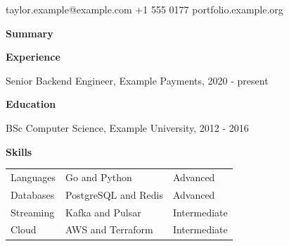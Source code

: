 \documentclass[10pt]{article}
\begin{document}
{\LARGE \Person}\par taylor.example@example.com \quad +1 555 0177 \quad portfolio.example.org\par\bigskip
\textbf{Summary}\par \Summary\par\medskip
\textbf{Experience}\par Senior Backend Engineer, Example Payments, 2020 - present\par
\JobA\par \JobB\par\medskip
\textbf{Education}\par BSc Computer Science, Example University, 2012 - 2016\par\medskip
\textbf{Skills}\par
\begin{tabular}{@{}p{5cm}p{5cm}p{5cm}@{}}
Languages & Go and Python & Advanced \\
Databases & PostgreSQL and Redis & Advanced \\
Streaming & Kafka and Pulsar & Intermediate \\
Cloud & AWS and Terraform & Intermediate \\
\end{tabular}
\end{document}
